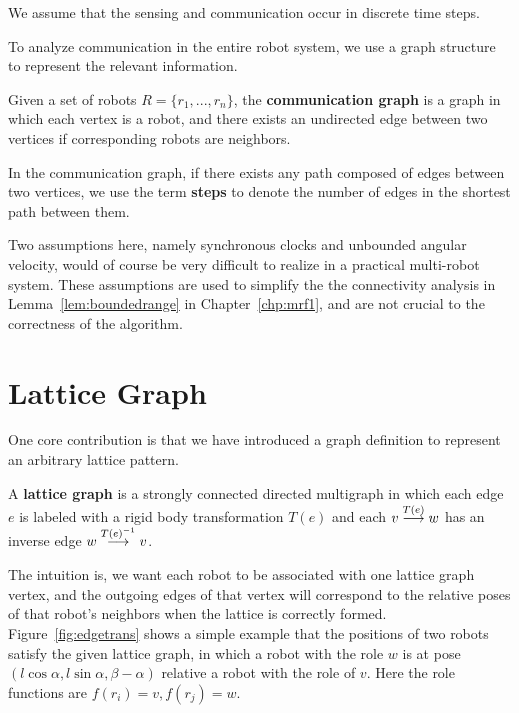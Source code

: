 We assume that the sensing and communication occur in discrete time steps. 

To analyze communication in the entire robot system, we use a graph structure to represent the relevant information.

\begin{defn}
  Given a set of robots $R =\{r_1, ..., r_n\}$, the \textbf{communication
  graph} is a graph in which each vertex is a robot, and there exists an
  undirected edge between two vertices if corresponding robots are neighbors.
\end{defn}

In the communication graph, if there exists any path composed of edges between two vertices, we use the term
\textbf{steps} to denote the number of edges in the shortest path between
them.

Two assumptions here, namely synchronous clocks and unbounded angular velocity, 
would of course be very difficult to realize in a practical multi-robot system. 
%
These assumptions are used to simplify the the connectivity analysis in Lemma~\ref{lem:boundedrange} in Chapter~\ref{chp:mrf1}, 
and are not crucial to the correctness of the algorithm.


\section{Lattice Graph}
\label{sec:latt-graph}
One core contribution is that we have introduced a graph definition to represent an arbitrary lattice pattern.
%
\begin{defn}
  \label{def:latticegraph}
  A \textbf{lattice graph} is a strongly connected directed multigraph in which
  each edge $e$ is labeled with a rigid body transformation $T(e)$ and each
  ${v}\overset{T(e)}{\longrightarrow}{w}$ has an inverse edge ${w}\overset{T(e)^{-1}}{\longrightarrow}{v}$.
\end{defn}

The intuition is, we want each robot to be associated with one lattice graph vertex, and the outgoing edges of that vertex will correspond to the relative poses of that robot's neighbors when the lattice is correctly formed.
%
Figure~\ref{fig:edgetrans} shows a simple example that the positions of two
robots satisfy the given lattice graph, in which a robot with the role $w$ is
at pose $(l\cos{\alpha}, l\sin{\alpha}, \beta-\alpha)$ relative a robot with the role of
$v$. Here the role functions are $f(r_i) = v, f(r_j) = w$.


